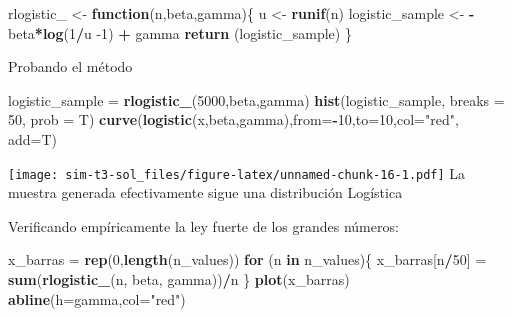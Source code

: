 \documentclass[]{article}
\newenvironment{Shaded}{\begin{snugshade}}{\end{snugshade}}
\newcommand{\ControlFlowTok}[1]{\textcolor[rgb]{0.13,0.29,0.53}{\textbf{#1}}}
\newcommand{\DataTypeTok}[1]{\textcolor[rgb]{0.13,0.29,0.53}{#1}}
\newcommand{\DecValTok}[1]{\textcolor[rgb]{0.00,0.00,0.81}{#1}}
\newcommand{\KeywordTok}[1]{\textcolor[rgb]{0.13,0.29,0.53}{\textbf{#1}}}
\newcommand{\NormalTok}[1]{#1}
\newcommand{\OperatorTok}[1]{\textcolor[rgb]{0.81,0.36,0.00}{\textbf{#1}}}
\newcommand{\StringTok}[1]{\textcolor[rgb]{0.31,0.60,0.02}{#1}}
\begin{document}
\begin{Shaded}
\begin{Highlighting}[]
\NormalTok{rlogistic_ <-}\StringTok{ }\ControlFlowTok{function}\NormalTok{(n,beta,gamma)\{}
\NormalTok{  u <-}\StringTok{ }\KeywordTok{runif}\NormalTok{(n)}
\NormalTok{  logistic_sample <-}\StringTok{ }\OperatorTok{-}\NormalTok{beta}\OperatorTok{*}\KeywordTok{log}\NormalTok{(}\DecValTok{1}\OperatorTok{/}\NormalTok{u }\DecValTok{-1}\NormalTok{) }\OperatorTok{+}\StringTok{ }\NormalTok{gamma}
  \KeywordTok{return}\NormalTok{ (logistic_sample)}
\NormalTok{\}}
\end{Highlighting}
\end{Shaded}

Probando el método

\begin{Shaded}
\begin{Highlighting}[]
\NormalTok{logistic_sample =}\StringTok{ }\KeywordTok{rlogistic_}\NormalTok{(}\DecValTok{5000}\NormalTok{,beta,gamma)}
\KeywordTok{hist}\NormalTok{(logistic_sample, }\DataTypeTok{breaks =} \DecValTok{50}\NormalTok{, }\DataTypeTok{prob =}\NormalTok{ T)}
\KeywordTok{curve}\NormalTok{(}\KeywordTok{logistic}\NormalTok{(x,beta,gamma),}\DataTypeTok{from=}\OperatorTok{-}\DecValTok{10}\NormalTok{,}\DataTypeTok{to=}\DecValTok{10}\NormalTok{,}\DataTypeTok{col=}\StringTok{"red"}\NormalTok{, }\DataTypeTok{add=}\NormalTok{T)}
\end{Highlighting}
\end{Shaded}

\texttt{[image: sim-t3-sol\_files/figure-latex/unnamed-chunk-16-1.pdf]}
La muestra generada efectivamente sigue una distribución Logística

Verificando empíricamente la ley fuerte de los grandes números:

\begin{Shaded}
\begin{Highlighting}[]
\NormalTok{x_barras =}\StringTok{ }\KeywordTok{rep}\NormalTok{(}\DecValTok{0}\NormalTok{,}\KeywordTok{length}\NormalTok{(n_values))}
\ControlFlowTok{for}\NormalTok{ (n }\ControlFlowTok{in}\NormalTok{ n_values)\{}
\NormalTok{  x_barras[n}\OperatorTok{/}\DecValTok{50}\NormalTok{] =}\StringTok{ }\KeywordTok{sum}\NormalTok{(}\KeywordTok{rlogistic_}\NormalTok{(n, beta, gamma))}\OperatorTok{/}\NormalTok{n}
\NormalTok{\}}
\KeywordTok{plot}\NormalTok{(x_barras)}
\KeywordTok{abline}\NormalTok{(}\DataTypeTok{h=}\NormalTok{gamma,}\DataTypeTok{col=}\StringTok{"red"}\NormalTok{)}
\end{Highlighting}
\end{Shaded}
\end{document}
